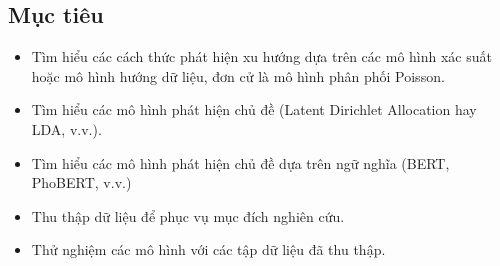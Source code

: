 \subsection{Mục tiêu}
\begin{itemize}
	\item Tìm hiểu các cách thức phát hiện xu hướng dựa trên các mô hình xác
		suất hoặc mô hình hướng dữ liệu, đơn cử là mô hình phân phối Poisson.

	\item Tìm hiểu các mô hình phát hiện chủ đề (Latent Dirichlet Allocation
		hay LDA, v.v.).

	\item Tìm hiểu các mô hình phát hiện chủ đề dựa trên ngữ nghĩa (BERT,
		PhoBERT, v.v.)
	
	\item Thu thập dữ liệu để phục vụ mục đích nghiên cứu.
	
	\item Thử nghiệm các mô hình với các tập dữ liệu đã thu thập.
\end{itemize}
